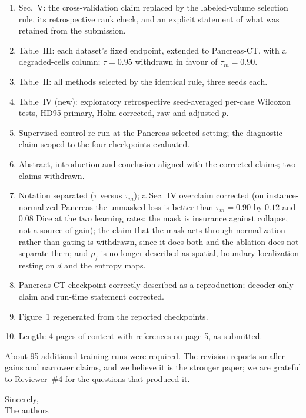 \documentclass[11pt,a4paper]{article}
\begin{document}
\begin{enumerate}[leftmargin=1.4em,itemsep=0.05em,topsep=0.2em]
\item Sec.~V: the cross-validation claim replaced by the labeled-volume selection rule, its retrospective rank check, and an explicit statement of what was retained from the submission.
\item Table~III: each dataset's fixed endpoint, extended to Pancreas-CT, with a degraded-cells column; $\tau=0.95$ withdrawn in favour of $\tau_m=0.90$.
\item Table~II: all methods selected by the identical rule, three seeds each.
\item Table~IV (new): exploratory retrospective seed-averaged per-case Wilcoxon tests, HD95 primary, Holm-corrected, raw and adjusted $p$.
\item Supervised control re-run at the Pancreas-selected setting; the diagnostic claim scoped to the four checkpoints evaluated.
\item Abstract, introduction and conclusion aligned with the corrected claims; two claims withdrawn.
\item Notation separated ($\tau$ versus $\tau_m$); a Sec.~IV overclaim corrected (on instance-normalized Pancreas the unmasked loss is better than $\tau_m=0.90$ by $0.12$ and $0.08$ Dice at the two learning rates; the mask is insurance against collapse, not a source of gain); the claim that the mask acts through normalization rather than gating is withdrawn, since it does both and the ablation does not separate them; and $\rho_f$ is no longer described as spatial, boundary localization resting on $\bar d$ and the entropy maps.
\item Pancreas-CT checkpoint correctly described as a reproduction; decoder-only claim and run-time statement corrected.
\item Figure~1 regenerated from the reported checkpoints.
\item Length: 4 pages of content with references on page 5, as submitted.
\end{enumerate}

About 95 additional training runs were required. The revision reports smaller gains and narrower claims, and we believe it is the stronger paper; we are grateful to Reviewer~\#4 for the questions that produced it.

\vspace{0.3em}
Sincerely,\\
The authors
\end{document}
